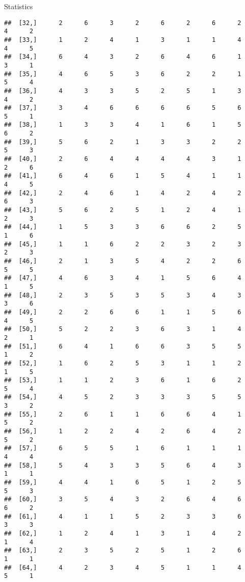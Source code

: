 \documentclass[
  ignorenonframetext,
]{beamer}
\begin{document}
\begin{frame}[fragile]{Statistics}
\begin{verbatim}
##  [32,]      2      6      3      2      6      2      6      2      4      2
##  [33,]      1      2      4      1      3      1      1      4      4      5
##  [34,]      6      4      3      2      6      4      6      1      3      1
##  [35,]      4      6      5      3      6      2      2      1      5      4
##  [36,]      4      3      3      5      2      5      1      3      4      2
##  [37,]      3      4      6      6      6      6      5      6      5      1
##  [38,]      1      3      3      4      1      6      1      5      6      2
##  [39,]      5      6      2      1      3      3      2      2      5      3
##  [40,]      2      6      4      4      4      4      3      1      2      6
##  [41,]      6      4      6      1      5      4      1      1      4      5
##  [42,]      2      4      6      1      4      2      4      2      6      3
##  [43,]      5      6      2      5      1      2      4      1      2      3
##  [44,]      1      5      3      3      6      6      2      5      1      6
##  [45,]      1      1      6      2      2      3      2      3      2      3
##  [46,]      2      1      3      5      4      2      2      6      5      5
##  [47,]      4      6      3      4      1      5      6      4      1      5
##  [48,]      2      3      5      3      5      3      4      3      3      6
##  [49,]      2      2      6      6      1      1      5      6      4      5
##  [50,]      5      2      2      3      6      3      1      4      2      1
##  [51,]      6      4      1      6      6      3      5      5      1      2
##  [52,]      1      6      2      5      3      1      1      2      1      5
##  [53,]      1      1      2      3      6      1      6      2      5      4
##  [54,]      4      5      2      3      3      3      5      5      3      2
##  [55,]      2      6      1      1      6      6      4      1      5      2
##  [56,]      1      2      2      4      2      6      4      2      5      2
##  [57,]      6      5      5      1      6      1      1      1      4      4
##  [58,]      5      4      3      3      5      6      4      3      1      1
##  [59,]      4      4      1      6      5      1      2      5      5      3
##  [60,]      3      5      4      3      2      6      4      6      6      2
##  [61,]      4      1      1      5      2      3      3      6      3      3
##  [62,]      1      2      4      1      3      1      4      2      1      4
##  [63,]      2      3      5      2      5      1      2      6      1      1
##  [64,]      4      2      3      4      5      1      1      4      5      1

\end{verbatim}
\end{frame}
\end{document}
